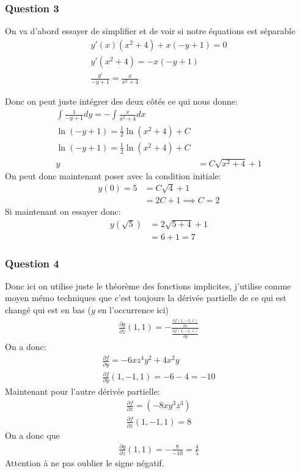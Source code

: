 \documentclass[a4paper]{article}
\begin{document}
\subsubsection{Question 3}
On va d'abord essayer de simplifier et de voir si notre équations est séparable
\begin{align*} 
    y'\left(x\right)\left(x^2 + 4\right) + x\left(-y + 1\right) = 0\\
    y'\left(x^2 + 4\right) = - x\left(-y + 1\right)\\
    \frac{y'}{-y + 1} = \frac{x}{x^2 + 4}
\end{align*}

Donc on peut juste intégrer des deux côtés ce qui nous donne:
\begin{align*} 
    \int \frac{1}{-y + 1} dy =  -\int \frac{x}{x^2 + 4} dx\\
    \ln\left(-y + 1\right) =  \frac{1}{2}\ln \left(x^2 + 4\right) + C\\
    \ln\left(-y + 1\right) =  \frac{1}{2}\ln \left(x^2 + 4\right)+ C\\
    y &= C\sqrt{x^2 + 4} + 1
\end{align*}
On peut donc maintenant poser avec la condition initiale:
\begin{align*} 
    y\left(0\right) = 5 &= C\sqrt{4} + 1\\
    &= 2C + 1 \implies C = 2
\end{align*}
Si maintenant on essayer donc:
\begin{align*} 
    y\left(\sqrt{5}\right) &= 2\sqrt{5 + 4} + 1\\
    &= 6 + 1 = 7
\end{align*}

\subsubsection{Question 4}
Donc ici on utilise juste le théorème des fonctions implicites, j'utilise comme moyen mémo techniques que c'est toujours la dérivée partielle de ce qui est changé qui est en bas ($y$ en l'occurrence ici)
\begin{align*} 
    \frac{\partial g}{\partial z} \left(1, 1\right) =- \frac{\frac{\partial f\left(1, -1, 1\right)}{\partial z} }{\frac{\partial f\left(1, -1, 1\right)}{\partial y} }
\end{align*}
On a donc:
\begin{align*} 
    \frac{\partial f}{\partial y}  = -6xz^4y^2 + 4x^2y\\
     \frac{\partial f}{\partial y}\left(1, -1, 1\right)  = -6 -4 = -10
\end{align*}
Maintenant pour l'autre dérivée partielle:
\begin{align*} 
    \frac{\partial f}{\partial z}  = \left(-8xy^3z^3\right)\\
    \frac{\partial f}{\partial z}\left(1, -1, 1\right)  = 8
\end{align*}
On a donc que
\begin{align*} 
    \frac{\partial g}{\partial z} \left(1, 1\right) =- \frac{8}{-10} = \frac{4}{5}
\end{align*}
Attention à ne pas oublier le signe négatif.
\end{document}
